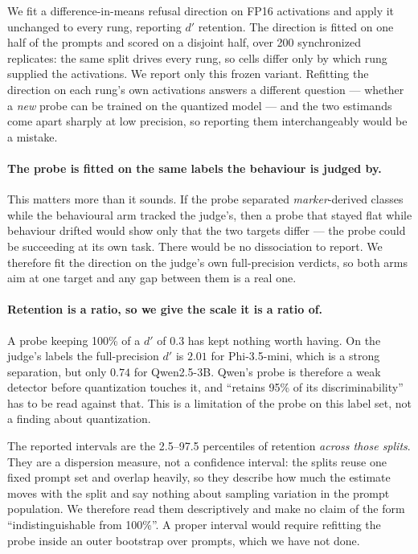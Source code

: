 \documentclass[11pt,a4paper]{article}
\begin{document}
We fit a difference-in-means refusal direction \citep{arditi2024refusal} on FP16
activations and apply it unchanged to every rung, reporting $d'$
\citep{green1966signal} retention. The direction is fitted on one half of the
prompts and scored on a disjoint half, over 200 synchronized replicates: the same
split drives every rung, so cells differ only by which rung supplied the
activations. We report only this frozen variant. Refitting the direction on each
rung's own activations answers a different question --- whether a \emph{new}
probe can be trained on the quantized model --- and the two estimands come apart
sharply at low precision, so reporting them interchangeably would be a mistake.

\paragraph{The probe is fitted on the same labels the behaviour is judged by.}
This matters more than it sounds. If the probe separated \emph{marker}-derived
classes while the behavioural arm tracked the judge's, then a probe that stayed
flat while behaviour drifted would show only that the two targets differ --- the
probe could be succeeding at its own task. There would be no dissociation to
report. We therefore fit the direction on the judge's own full-precision
verdicts, so both arms aim at one target and any gap between them is a real one.

\paragraph{Retention is a ratio, so we give the scale it is a ratio of.} A probe
keeping 100\% of a $d'$ of $0.3$ has kept nothing worth having. On the judge's
labels the full-precision $d'$ is $2.01$ for Phi-3.5-mini, which is a strong
separation, but only $0.74$ for Qwen2.5-3B. Qwen's probe is therefore a weak
detector before quantization touches it, and ``retains 95\% of its
discriminability'' has to be read against that. This is a limitation of the
probe on this label set, not a finding about quantization.

The reported intervals are the 2.5--97.5 percentiles of retention \emph{across
those splits}. They are a dispersion measure, not a confidence interval: the
splits reuse one fixed prompt set and overlap heavily, so they describe how much
the estimate moves with the split and say nothing about sampling variation in the
prompt population. We therefore read them descriptively and make no claim of the
form ``indistinguishable from 100\%''. A proper interval would require refitting
the probe inside an outer bootstrap over prompts, which we have not done.
\end{document}
